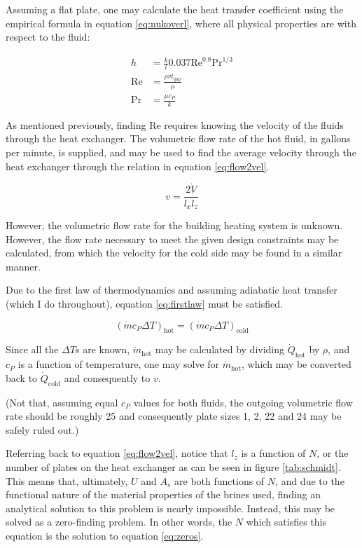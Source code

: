\documentclass[12pt,letterpaper]{article}
\begin{document}
Assuming a flat plate, one may calculate the heat transfer coefficient using the empirical formula in equation \ref{eq:nukoverl}, where all physical properties are with respect to the fluid:

\begin{align}
\label{eq:nukoverl}
h &=\frac{k}{l} 0.037\textrm{Re}^{0.8}\textrm{Pr}^{1/3}\\
\label{eq:re}
\textrm{Re}&=\frac{\rho v t_{\textrm{gap}}}{\mu}\\
\label{eq:pr}
\textrm{Pr}&=\frac{\mu c_P}{k}
\end{align}

As mentioned previously, finding Re requires knowing the velocity of the fluids through the heat exchanger.  The volumetric flow rate of the hot fluid, in gallons per minute, is supplied, and may be used to find the average velocity through the heat exchanger through the relation in equation \ref{eq:flow2vel}.

\begin{equation}
\label{eq:flow2vel}
v = \frac{2\dot{V}}{l_x l_z}
\end{equation}

However, the volumetric flow rate for the building heating system is unknown. However, the flow rate necessary to meet the given design constraints may be calculated, from which the velocity for the cold side may be found in a similar manner. 

Due to the first law of thermodynamics and assuming adiabatic heat transfer (which I do throughout), equation \ref{eq:firstlaw} must be satisfied.

\begin{equation}
\label{eq:firstlaw}
\left(\dot{m} c_P \Delta T \right)_{\textrm{hot}} = \left(\dot{m} c_P \Delta T \right)_{\textrm{cold}}
\end{equation}

Since all the \(\Delta T\)s are known, \(\dot{m}_{\textrm{hot}}\) may be calculated by dividing \(\dot{Q}_{\textrm{hot}}\) by \(\rho\), and \(c_P\) is a function of temperature, one may solve for \(\dot{m}_{\textrm{hot}}\), which may be converted back to \(\dot{Q}_{\textrm{cold}}\) and consequently to \(v\).

(Not that, assuming equal \(c_P\) values for both fluids, the outgoing volumetric flow rate should be roughly 25 and consequently plate sizes 1, 2, 22 and 24 may be safely ruled out.)

Referring back to equation \ref{eq:flow2vel}, notice that \(l_z\) is a function of \(N\), or the number of plates on the heat exchanger as can be seen in figure \ref{tab:schmidt}. This means that, ultimately, \(U\) and \(A_s\) are both functions of \(N\), and due to the functional nature of the material properties of the brines used, finding an analytical solution to this problem is nearly impossible.  Instead, this may be solved as a zero-finding problem. In other words, the \(N\) which satisfies this equation is the solution to equation \ref{eq:zeros}.
\end{document}
